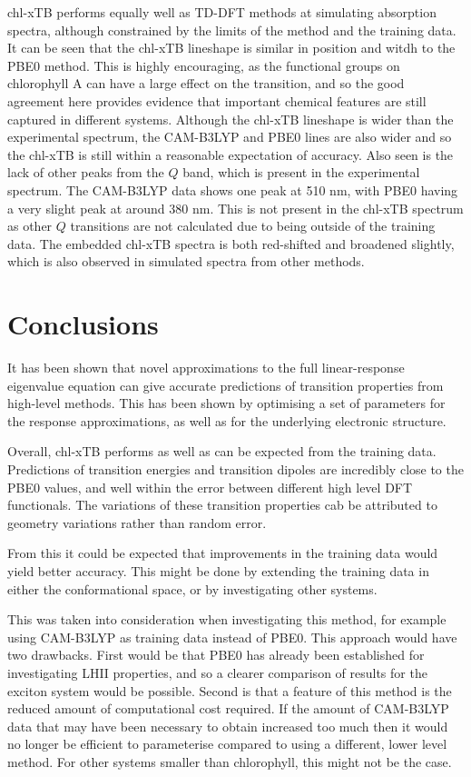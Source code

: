 chl-xTB performs equally well as TD-DFT methods at simulating absorption spectra,
although constrained by the limits of the method and the training data.
It can be seen that the chl-xTB lineshape is similar in position and witdh to the
PBE0 method. This is highly encouraging, as the functional groups on chlorophyll A
can have a large effect on the \Qy transition, and so the good agreement here provides
evidence that important chemical features are still captured in different systems.
Although the chl-xTB lineshape is wider than the experimental spectrum, the CAM-B3LYP 
and PBE0 lines are also wider and so the chl-xTB is still within a reasonable expectation 
of accuracy.
Also seen is the lack of other peaks from the $Q$ band, which is present in the
experimental spectrum. The CAM-B3LYP data shows one peak at 510 nm, with PBE0 having
a very slight peak at around 380 nm. This is not present in the chl-xTB spectrum
as other $Q$ transitions are not calculated due to being outside of the training
data. The embedded chl-xTB spectra is both red-shifted and broadened slightly, which
is also observed in simulated spectra from other methods.

\section{Conclusions}
\label{sec:chl_conclusions}

It has been shown that novel approximations to the full linear-response eigenvalue
equation can give accurate predictions of transition properties from high-level methods.
This has been shown by optimising a set of parameters for the response approximations,
as well as for the underlying electronic structure.

Overall, chl-xTB performs as well as can be expected from the training data. Predictions
of transition energies and transition dipoles are incredibly close to the PBE0
values, and well within the error between different high level DFT functionals. 
The variations of these transition properties cab be attributed to geometry variations
rather than random error.

From this it could be expected that improvements in the training data would yield 
better accuracy. This might be done by extending the training data in either the 
conformational space, or by investigating other systems. 

This was taken into consideration when investigating this method,
for example using CAM-B3LYP as training data instead of PBE0. This approach would
have two drawbacks. First would be that PBE0 has already been established for investigating
LHII properties, and so a clearer comparison of results for the exciton system would
be possible. Second is that a feature of this method is the reduced amount of 
computational cost required. If the amount of CAM-B3LYP data that may have been 
necessary to obtain increased too much then it would no longer be efficient to 
parameterise compared to using a different, lower level method. For other systems
smaller than chlorophyll, this might not be the case.
